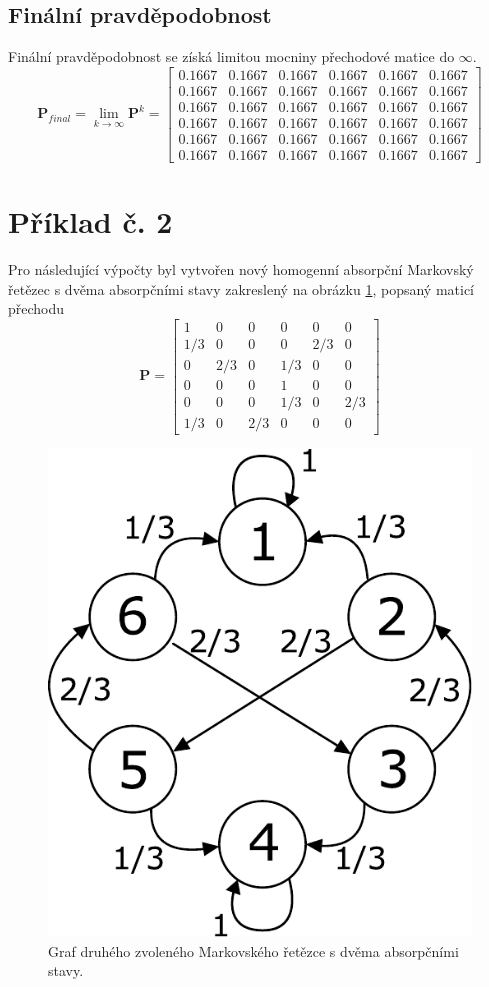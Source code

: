 \documentclass{article}
\begin{document}
		\subsection{Finální pravděpodobnost}
			Finální pravděpodobnost se získá limitou mocniny přechodové matice do \(\infty\).
			\[\mathbf{P}_{final} = \lim_{k \to \infty}\mathbf{P}^{k}=
			\begin{bmatrix}
				0.1667&0.1667&0.1667&0.1667&0.1667&0.1667\\
				0.1667&0.1667&0.1667&0.1667&0.1667&0.1667\\
				0.1667&0.1667&0.1667&0.1667&0.1667&0.1667\\
				0.1667&0.1667&0.1667&0.1667&0.1667&0.1667\\
				0.1667&0.1667&0.1667&0.1667&0.1667&0.1667\\
				0.1667&0.1667&0.1667&0.1667&0.1667&0.1667
			\end{bmatrix}\]
		
	\newpage	
	\section{Příklad č. 2}
		Pro následující výpočty byl vytvořen nový homogenní absorpční Markovský řetězec s dvěma absorpčními stavy zakreslený na obrázku \ref{pic:markovsky_retezec_obr_2}, popsaný maticí přechodu
		\[\mathbf{P} = \begin{bmatrix}
			1	&0	&0	&0	&0	&0\\
			1/3	&0	&0	&0	&2/3&0\\
			0	&2/3&0	&1/3&0	&0\\
			0	&0	&0	&1	&0	&0\\
			0	&0	&0	&1/3&0	&2/3\\
			1/3	&0	&2/3&0	&0	&0
		\end{bmatrix}\]
		
			\begin{figure}[H]
				\centering
				\includegraphics[width=.5\textwidth]{./Graphics/priklad_02.pdf}
				\caption{Graf druhého zvoleného Markovského řetězce s dvěma absorpčními stavy.}
				\label{pic:markovsky_retezec_obr_2}
			\end{figure}
\end{document}
